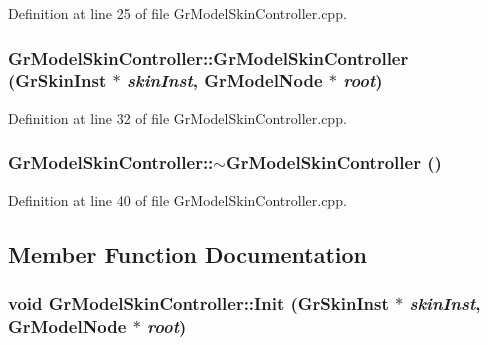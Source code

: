 Definition at line 25 of file GrModelSkinController.cpp.\hypertarget{class_gr_model_skin_controller_ac47bf4d89914bc9b91da6f2abb28236}{
\subsubsection[{GrModelSkinController}]{\setlength{\rightskip}{0pt plus 5cm}GrModelSkinController::GrModelSkinController ({\bf GrSkinInst} $\ast$ {\em skinInst}, \/  {\bf GrModelNode} $\ast$ {\em root})}}
\label{class_gr_model_skin_controller_ac47bf4d89914bc9b91da6f2abb28236}




Definition at line 32 of file GrModelSkinController.cpp.\hypertarget{class_gr_model_skin_controller_386518c2f1396205b653d09f79f4a8d8}{
\subsubsection[{$\sim$GrModelSkinController}]{\setlength{\rightskip}{0pt plus 5cm}GrModelSkinController::$\sim$GrModelSkinController ()}}
\label{class_gr_model_skin_controller_386518c2f1396205b653d09f79f4a8d8}




Definition at line 40 of file GrModelSkinController.cpp.

\subsection{Member Function Documentation}
\hypertarget{class_gr_model_skin_controller_84a6d50f21bf0731bccc817506827808}{
\subsubsection[{Init}]{\setlength{\rightskip}{0pt plus 5cm}void GrModelSkinController::Init ({\bf GrSkinInst} $\ast$ {\em skinInst}, \/  {\bf GrModelNode} $\ast$ {\em root})}}
\label{class_gr_model_skin_controller_84a6d50f21bf0731bccc817506827808}




